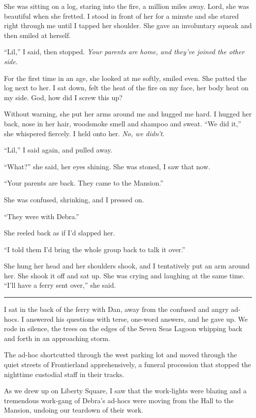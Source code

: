 She was sitting on a log, staring into the fire, a million miles
away. Lord, she was beautiful when she fretted. I stood in front of
her for a minute and she stared right through me until I tapped her
shoulder. She gave an involuntary squeak and then smiled at
herself.

“Lil,” I said, then stopped.
\emph{Your parents are home, and they've joined the other side}.

For the first time in an age, she looked at me softly, smiled even.
She patted the log next to her. I sat down, felt the heat of the
fire on my face, her body heat on my side. God, how did I screw
this up?

Without warning, she put her arms around me and hugged me hard. I
hugged her back, nose in her hair, woodsmoke smell and shampoo and
sweat. “We did it,” she whispered fiercely. I held onto her.
\emph{No, we didn't}.

“Lil,” I said again, and pulled away.

“What?” she said, her eyes shining. She was stoned, I saw that
now.

“Your parents are back. They came to the Mansion.”

She was confused, shrinking, and I pressed on.

“They were with Debra.”

She reeled back as if I'd slapped her.

“I told them I'd bring the whole group back to talk it over.”

She hung her head and her shoulders shook, and I tentatively put an
arm around her. She shook it off and sat up. She was crying and
laughing at the same time. “I'll have a ferry sent over,” she
said.

\begin{center}\rule{3in}{0.4pt}\end{center}

I sat in the back of the ferry with Dan, away from the confused and
angry ad-hocs. I answered his questions with terse, one-word
answers, and he gave up. We rode in silence, the trees on the edges
of the Seven Seas Lagoon whipping back and forth in an approaching
storm.

The ad-hoc shortcutted through the west parking lot and moved
through the quiet streets of Frontierland apprehensively, a funeral
procession that stopped the nighttime custodial staff in their
tracks.

As we drew up on Liberty Square, I saw that the work-lights were
blazing and a tremendous work-gang of Debra's ad-hocs were moving
from the Hall to the Mansion, undoing our teardown of their work.

